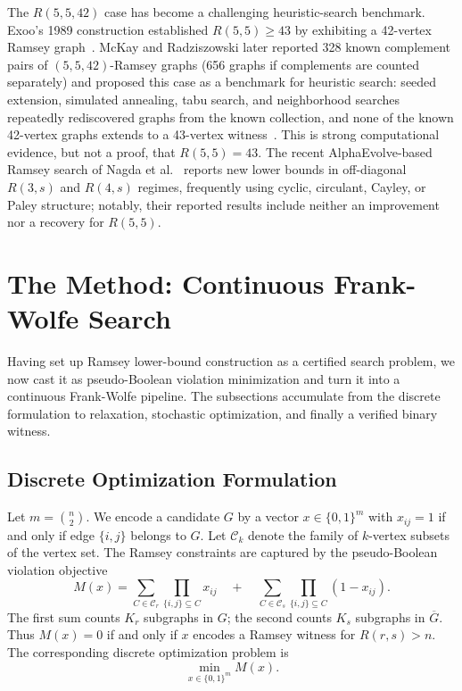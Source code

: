 \documentclass{article}
\begin{document}
The $R(5,5,42)$ case has become a challenging heuristic-search benchmark. Exoo's 1989 construction established $R(5,5) \geq 43$ by exhibiting a 42-vertex Ramsey graph~\cite{exoo1989lower}. McKay and Radziszowski later reported 328 known complement pairs of $(5,5,42)$-Ramsey graphs (656 graphs if complements are counted separately) and proposed this case as a benchmark for heuristic search: seeded extension, simulated annealing, tabu search, and neighborhood searches repeatedly rediscovered graphs from the known collection, and none of the known 42-vertex graphs extends to a 43-vertex witness~\cite{mckayradziszowski1997subgraph}. This is strong computational evidence, but not a proof, that $R(5,5) = 43$. The recent AlphaEvolve-based Ramsey search of Nagda et al.~\cite{nagda2026reinforcedgenerationcombinatorialstructures} reports new lower bounds in off-diagonal $R(3,s)$ and $R(4,s)$ regimes, frequently using cyclic, circulant, Cayley, or Paley structure; notably, their reported results include neither an improvement nor a recovery for $R(5,5)$.



\section{The Method: Continuous Frank-Wolfe Search}\label{sec:method}

Having set up Ramsey lower-bound construction as a certified search problem, we now cast it as pseudo-Boolean violation minimization and turn it into a continuous Frank-Wolfe pipeline. The subsections accumulate from the discrete formulation to relaxation, stochastic optimization, and finally a verified binary witness.

\subsection{Discrete Optimization Formulation}\label{sec:discrete-formulation}

Let $m = \binom{n}{2}$. We encode a candidate $G$ by a vector $x \in \{0,1\}^m$ with $x_{ij} = 1$ if and only if edge $\{i,j\}$ belongs to $G$. Let $\mathcal{C}_k$ denote the family of $k$-vertex subsets of the vertex set. The Ramsey constraints are captured by the pseudo-Boolean violation objective
\begin{equation}\label{eq:no-monochromatic-cliques}
    M(x) = \sum_{C \in \mathcal{C}_r} \prod_{\{i,j\} \subseteq C} x_{ij}
    \quad + \quad
    \sum_{C \in \mathcal{C}_s} \prod_{\{i,j\} \subseteq C} \left(1 - x_{ij}\right).
\end{equation}
The first sum counts $K_r$ subgraphs in $G$; the second counts $K_s$ subgraphs in $\overline{G}$. Thus $M(x) = 0$ if and only if $x$ encodes a Ramsey witness for $R(r,s) > n$. The corresponding discrete optimization problem is
\begin{equation}\label{eq:opt-problem}
    \min_{x \in \{0,1\}^m} M(x).
\end{equation}
\end{document}
